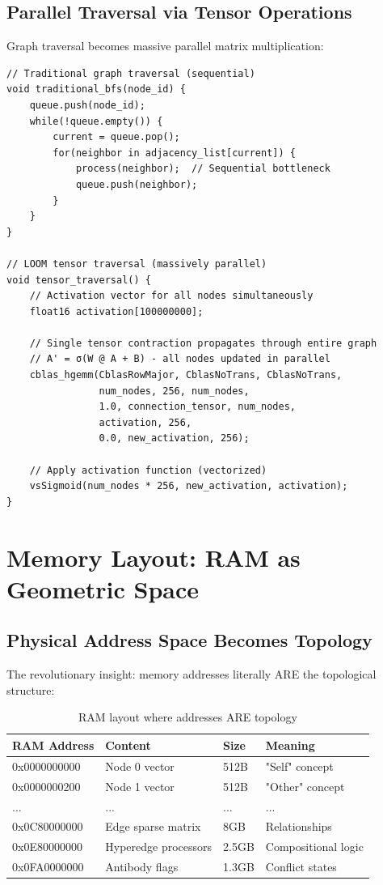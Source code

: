 \documentclass[12pt,a4paper,openany]{book} %
\begin{document}
\subsection{Parallel Traversal via Tensor Operations}

Graph traversal becomes massive parallel matrix multiplication:

\vspace{0.5em}
\begin{lstlisting}[style=cpp]
// Traditional graph traversal (sequential)
void traditional_bfs(node_id) {
    queue.push(node_id);
    while(!queue.empty()) {
        current = queue.pop();
        for(neighbor in adjacency_list[current]) {
            process(neighbor);  // Sequential bottleneck
            queue.push(neighbor);
        }
    }
}

// LOOM tensor traversal (massively parallel)
void tensor_traversal() {
    // Activation vector for all nodes simultaneously
    float16 activation[100000000];

    // Single tensor contraction propagates through entire graph
    // A' = σ(W @ A + B) - all nodes updated in parallel
    cblas_hgemm(CblasRowMajor, CblasNoTrans, CblasNoTrans,
                num_nodes, 256, num_nodes,
                1.0, connection_tensor, num_nodes,
                activation, 256,
                0.0, new_activation, 256);

    // Apply activation function (vectorized)
    vsSigmoid(num_nodes * 256, new_activation, activation);
}
\end{lstlisting}
\vspace{0.5em}

\section{Memory Layout: RAM as Geometric Space}

\subsection{Physical Address Space Becomes Topology}

The revolutionary insight: memory addresses literally ARE the topological structure:

\begin{table}[h]
\centering
\begin{tabular}{llll}
\toprule
\textbf{RAM Address} & \textbf{Content} & \textbf{Size} & \textbf{Meaning} \\
\midrule
0x0000000000 & Node 0 vector & 512B & "Self" concept \\
0x0000000200 & Node 1 vector & 512B & "Other" concept \\
... & ... & ... & ... \\
0x0C80000000 & Edge sparse matrix & 8GB & Relationships \\
0x0E80000000 & Hyperedge processors & 2.5GB & Compositional logic \\
0x0FA0000000 & Antibody flags & 1.3GB & Conflict states \\
\bottomrule
\end{tabular}
\caption{RAM layout where addresses ARE topology}
\end{table}
\end{document}
